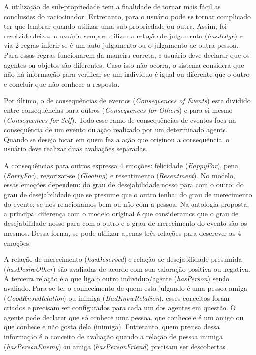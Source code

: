 A utilização de sub-propriedade tem a finalidade de tornar mais fácil as
conclusões do raciocinador. Entretanto, para o usuário pode se tornar
complicado ter que lembrar quando utilizar uma sub-propriedade ou outra.
Assim, foi resolvido deixar o usuário sempre utilizar a relação de julgamento
(\emph{hasJudge}) e via 2 regras inferir se é um auto-julgamento ou o
julgamento de outra pessoa. Para essas regras funcionarem da maneira correta,
o usuário deve declarar que os agentes ou objetos são diferentes. Caso isso
não ocorra, o sistema considera que não há informação para verificar se um
individuo é igual ou diferente que o outro e concluir que não conhece a
resposta.

Por último, o de consequências de eventos (\emph{Consequences of Events})
esta dividido entre consequências para outros (\emph{Consequences for Others})
e para si mesmo (\emph{Consequences for Self}). Todo esse ramo de consequências
de eventos foca na consequência de um evento ou ação realizado por um
determinado agente. Quando se deseja focar em quem fez a ação que originou
a consequência, o usuário deve realizar duas avaliações separadas.

A consequências para outros expressa 4 emoções: felicidade
(\emph{HappyFor}), pena (\emph{SorryFor}), regorizar-se (\emph{Gloating}) e
resentimento (\emph{Resentment}). No modelo, essas emoções dependem: do grau
de desejabilidade nosso para com o outro; do grau de desejabilidade que se
presume que o outro tenha; do grau de merecimento do evento; se nos
relacionamos bem ou não com a pessoa. Na ontologia proposta, a principal
diferença com o modelo original é que consideramos que o grau de
desejabilidade nosso para com o outro e o grau de merecimento do evento são os
mesmos. Dessa forma, se pode utilizar apenas três relações para descrever as
4 emoções.

A relação de merecimento (\emph{hasDeserved}) e relação de desejabilidade
presumida (\emph{hasDesireOther}) são avaliadas de acordo com sua valoração
positiva ou negativa. A terceira relação é a que liga o outro individuo/agente
(\emph{hasPerson}) sendo avaliado. Para se ter o conhecimento de quem esta
julgando é uma pessoa amiga (\emph{GoodKnowRelation}) ou inimiga
(\emph{BadKnowRelation}), esses conceitos foram criados e precisam ser
configurados para cada um dos agentes em questão. O agente pode declarar que
só conhece uma pessoa, que conhece e é um amigo ou que conhece e não gosta
dela (inimiga). Entretanto, quem precisa dessa informação é o conceito de
avaliação quando a relação de pessoa inimiga (\emph{hasPersonEnemy}) ou amiga
(\emph{hasPersonFriend}) precisam ser descobertas.

